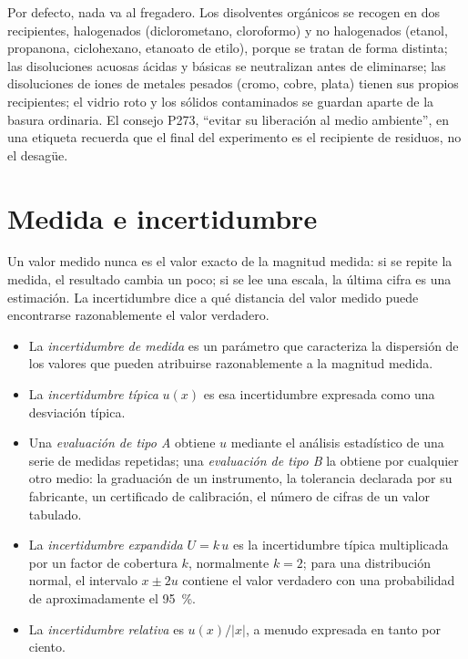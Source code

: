 \begin{inthelab}
Por defecto, nada va al fregadero. Los disolventes orgánicos se recogen
en dos recipientes, halogenados (diclorometano, cloroformo) y no
halogenados (etanol, propanona, ciclohexano, etanoato de etilo), porque
se tratan de forma distinta; las disoluciones acuosas ácidas y básicas se
neutralizan antes de eliminarse; las disoluciones de iones de metales
pesados (cromo, cobre, plata) tienen sus propios recipientes; el vidrio
roto y los sólidos contaminados se guardan aparte de la basura ordinaria.
El consejo P273, ``evitar su liberación al medio ambiente'', en una
etiqueta recuerda que el final del experimento es el recipiente de
residuos, no el desagüe.
\end{inthelab}

\section{Medida e incertidumbre}

Un valor medido nunca es el valor exacto de la magnitud medida: si se
repite la medida, el resultado cambia un poco; si se lee una escala, la
última cifra es una estimación. La incertidumbre dice a qué distancia del
valor medido puede encontrarse razonablemente el valor verdadero.

\begin{definition}\label{def:b1:lab-techniques-1:uncertainty}
\begin{itemize}
  \item La \emph{incertidumbre de medida}
        es un parámetro que caracteriza la dispersión de los valores que
        pueden atribuirse razonablemente a la magnitud medida.
  \item La \emph{incertidumbre típica} $u(x)$
        es esa incertidumbre expresada como una desviación típica.
  \item Una \emph{evaluación de tipo A} obtiene $u$
        mediante el análisis estadístico de una serie de medidas
        repetidas; una \emph{evaluación de tipo B} la
        obtiene por cualquier otro medio: la graduación de un instrumento,
        la tolerancia declarada por su fabricante, un certificado de
        calibración, el número de cifras de un valor tabulado.
  \item La \emph{incertidumbre expandida}
        $U = k\,u$ es la incertidumbre típica multiplicada por un factor
        de cobertura $k$, normalmente $k = 2$; para una distribución
        normal, el intervalo $x \pm 2u$ contiene el valor verdadero con
        una probabilidad de aproximadamente el \qty{95}{\percent}.
  \item La \emph{incertidumbre relativa} es
        $u(x)/|x|$, a menudo expresada en tanto por ciento.
\end{itemize}
\end{definition}

